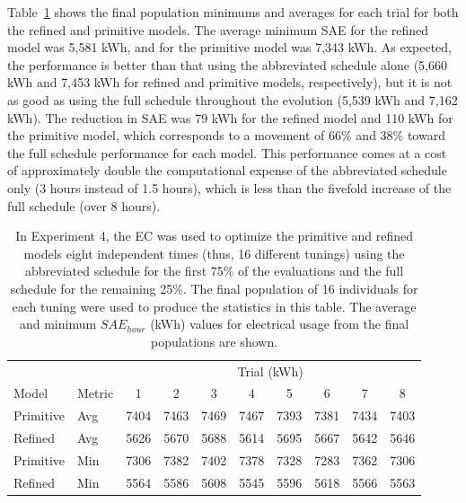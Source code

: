 \documentclass[preprint, review, 12pt]{elsarticle}
\begin{document}
{Table~\ref{tab:hourly-serial} shows the final population minimums and averages for each trial for both the refined and primitive models. The average minimum SAE for the refined model was 5,581 kWh, and for the primitive model was 7,343 kWh. As expected, the performance is better than that using the abbreviated schedule alone (5,660 kWh and 7,453 kWh for refined and primitive models, respectively), but it is not as good as using the full schedule throughout the evolution (5,539 kWh and 7,162 kWh). The reduction in SAE was 79 kWh for the refined model and 110 kWh for the primitive model, which corresponds to a movement of 66\% and 38\% toward the full schedule performance for each model. This performance comes at a cost of approximately double the computational expense of the abbreviated schedule only (3 hours instead of 1.5 hours), which is less than the fivefold increase of the full schedule (over 8 hours). 


\begin{table}[htbp]
\centering
\caption{In Experiment 4, the EC was used to optimize the primitive and refined models eight independent times (thus, 16 different tunings) using the abbreviated schedule for the first 75\% of the evaluations and the full schedule for the remaining 25\%. The final population of 16 individuals for each tuning were used to produce the statistics in this table. The average and minimum $SAE_{hour}$ (kWh) values for electrical usage from the final populations are shown.}
\label{tab:hourly-serial}
\begin{tabular}{llcccccccc}
\toprule
 &  & \multicolumn{8}{c}{Trial (kWh)}\\
Model & Metric & 1 & 2 & 3 & 4 & 5 & 6 & 7 & 8\\
\midrule
Primitive & Avg & 7404 & 7463 & 7469 & 7467 & 7393 & 7381 & 7434 & 7403\\\rowcolor{DarkRow}
Refined   & Avg & 5626 & 5670 & 5688 & 5614 & 5695 & 5667 & 5642 & 5646\\
Primitive & Min & 7306 & 7382 & 7402 & 7378 & 7328 & 7283 & 7362 & 7306\\\rowcolor{DarkRow}
Refined   & Min & 5564 & 5586 & 5608 & 5545 & 5596 & 5618 & 5566 & 5563\\
\bottomrule
\end{tabular}
\end{table}

}
\end{document}
